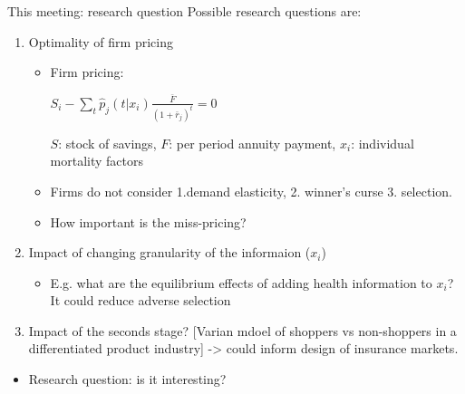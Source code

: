 \documentclass[10pt,aspectratio=169]{beamer}
\begin{document}
\begin{frame}{This meeting: research question}
Possible research questions are: 



 \begin{enumerate}
        \item Optimality of firm pricing 

        \begin{itemize}
            \item Firm pricing: 

            $S_{i}-\sum_{t}\hat{p}_{j}(t|x_{i}) \frac{\bar{F}}{(1+\bar{r}_{j})^{t}}=0$
            
            $S$: stock of savings, $F$: per period annuity payment, $x_i$: individual mortality factors 
            \item Firms do not consider 1.demand elasticity, 2. winner's curse 3. selection. 

            \item How important is the miss-pricing?
        \end{itemize}
        
        \item Impact of changing granularity of the informaion ($x_i$)

         \begin{itemize}
            \item E.g. what are the equilibrium effects of adding health information to $x_i$? It could reduce adverse selection 
        \end{itemize}
        
        \item Impact of the seconds stage?  [Varian mdoel of shoppers vs non-shoppers in a differentiated product industry] -> could inform design of insurance markets.

    \end{enumerate}
    




\begin{itemize}
   
   
    \item Research question: is it interesting? 


     
\end{itemize}
\end{frame}
\end{document}
